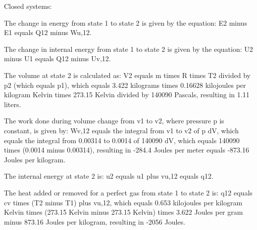 Closed systems:

The change in energy from state 1 to state 2 is given by the equation:
E2 minus E1 equals Q12 minus Wu,12.

The change in internal energy from state 1 to state 2 is given by the equation:
U2 minus U1 equals Q12 minus Uv,12.

The volume at state 2 is calculated as:
V2 equals m times R times T2 divided by p2 (which equals p1),
which equals 3.422 kilograms times 0.16628 kilojoules per kilogram Kelvin times 273.15 Kelvin divided by 140090 Pascals, resulting in 1.11 liters.

The work done during volume change from v1 to v2, where pressure p is constant, is given by:
Wv,12 equals the integral from v1 to v2 of p dV,
which equals the integral from 0.00314 to 0.0014 of 140090 dV,
which equals 140090 times (0.0014 minus 0.00314),
resulting in -284.4 Joules per meter equals -873.16 Joules per kilogram.

The internal energy at state 2 is:
u2 equals u1 plus vu,12 equals q12.

The heat added or removed for a perfect gas from state 1 to state 2 is:
q12 equals cv times (T2 minus T1) plus vu,12,
which equals 0.653 kilojoules per kilogram Kelvin times (273.15 Kelvin minus 273.15 Kelvin) times 3.622 Joules per gram minus 873.16 Joules per kilogram,
resulting in -2056 Joules.
